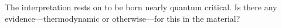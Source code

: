 The interpretation rests on  to be born nearly quantum critical. Is there any evidence---thermodynamic or otherwise---for this in the material?
